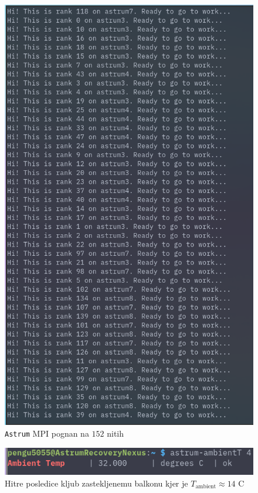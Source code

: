 \documentclass[a4paper]{article}
\begin{document}
\begin{figure}[H]
    \centering
    \includegraphics[height=0.45\textheight]{./ranks.png}
    \caption{\texttt{Astrum} MPI pognan na $152$ nitih}
    \label{fig:astrum-mpi}
\end{figure}

\begin{figure}
    \centering
    \includegraphics[height=0.05\textheight]{./temp.png}
    \caption{Hitre posledice kljub zastekljenemu balkonu kjer je $T_{\mathrm{ambient}} \approx 14$ \textdegree C}
    \label{fig:astrum-temp}
\end{figure}
\end{document}
